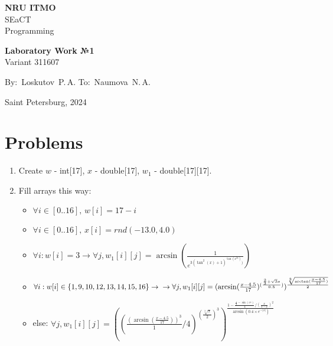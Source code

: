 \documentclass[12pt]{article}
\begin{document}
	\begin{center}
		\thispagestyle{empty}
		\LARGE
		\textbf{NRU ITMO}\\
		SEaCT\\
		Programming
		
		\vspace{7cm}
		
		\huge
		
		\textbf{Laboratory Work №1}\\
		\vspace{2cm}
		\Large
		Variant 311607 
		
		\LARGE
		\vspace{5cm}
		\vbox{
			\hfill
			\vbox{
				\hbox{By: Loskutov P.\,A.}
				\hbox{To: Naumova N.\,A.}
			}
		} 
		
		\vspace{2.5cm}
		Saint Petersburg, 2024
		\newpage
		\tableofcontents
	\end{center}
	\newpage
	\section{\LARGE Problems}
	\Large
	\begin{enumerate}
		\item Create \(w\) - int[17], \(x\) - double[17], \(w_1\) - double[17][17].
		\item Fill arrays this way:
		\begin{itemize}
		\item \(\forall i \in [0..16],\,w[i] = 17 - i\)
		\item \(\forall i \in [0..16],\,x[i] = rnd(-13.0, 4.0)\)
			\item \(\forall i: w[i] = 3 \rightarrow \forall j, w_1[i][j] = \arcsin(\frac{1}{e^{3(\tan^2(x)+1)^{\tan(x^{2x})})}})\)
			\item \(\forall i: w[i] \in \{1, 9, 10, 12, 13, 14, 15, 16\} \rightarrow\\\rightarrow \forall j, w_1[i][j] = (\arcsin(\frac{x-4.5}{17})^{(\frac{\frac{2}{3}+\sqrt{3}x}{0.5})})^{\frac{\sqrt[3]{\arctan(\frac{x-4.5}{17})}}{2}}\)
			\item else: \(\forall j,w_1[i][j] = ((\frac{(\arcsin(\frac{x-4.5}{17}))^{3}}{1}/4)^{(\frac{\sqrt[3]{x}}{2})^3})^{\frac{1-\frac{\frac{1}{2}-\sin(e^{x})}{4}/(\frac{x}{3-x})^2}{\arcsin(0.4\times e^{-|x|})}}
		\)
		\end{itemize}
	\end{enumerate}
	\newpage
\end{document}
